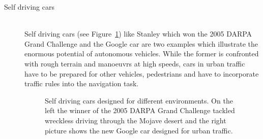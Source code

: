\begin{description}
\item[Self driving cars]\hfill \\
Self driving cars (see Figure~\ref{fig:fig_auto}) like Stanley \cite{stanley} which won the 2005 DARPA Grand Challenge and the Google car \cite{guizzo2011google} are two examples which illustrate the enormous potential of autonomous vehicles.
While the former is confronted with rough terrain and manoeuvrs at high speeds, cars in urban traffic have to be prepared for other vehicles, pedestrians and have to incorporate traffic rules into the navigation task. 

\begin{figure}[thpb]
	  \myfloatalign
      \footnotesize
      \centering
   \caption[Selfdriving car]{Self driving cars designed for different environments. On the left the winner of the 2005 DARPA Grand Challenge tackled wreckless driving through the Mojave desert and the right picture shows the new Google car designed for urban traffic.}
   \label{fig:fig_auto}
\end{figure}


\end{description}
